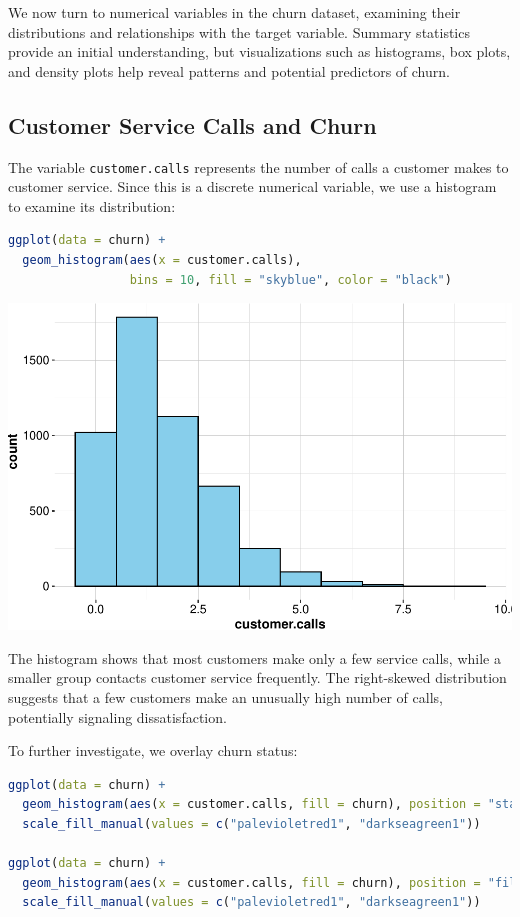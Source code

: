 \documentclass[
]{book}
\newcommand{\passthrough}[1]{#1}
\theoremstyle{definition}
\theoremstyle{definition}
\theoremstyle{definition}
\theoremstyle{definition}
\theoremstyle{remark}
\begin{document}
We now turn to numerical variables in the churn dataset, examining their distributions and relationships with the target variable. Summary statistics provide an initial understanding, but visualizations such as histograms, box plots, and density plots help reveal patterns and potential predictors of churn.

\subsection*{Customer Service Calls and Churn}\label{customer-service-calls-and-churn}

The variable \passthrough{\lstinline!customer.calls!} represents the number of calls a customer makes to customer service. Since this is a discrete numerical variable, we use a histogram to examine its distribution:

\begin{lstlisting}[language=R]
ggplot(data = churn) +
  geom_histogram(aes(x = customer.calls), 
                 bins = 10, fill = "skyblue", color = "black")
\end{lstlisting}

\begin{center}\includegraphics[width=0.7\linewidth]{EDA_files/figure-latex/unnamed-chunk-9-1} \end{center}

The histogram shows that most customers make only a few service calls, while a smaller group contacts customer service frequently. The right-skewed distribution suggests that a few customers make an unusually high number of calls, potentially signaling dissatisfaction.

To further investigate, we overlay churn status:

\begin{lstlisting}[language=R]
ggplot(data = churn) +
  geom_histogram(aes(x = customer.calls, fill = churn), position = "stack") +
  scale_fill_manual(values = c("palevioletred1", "darkseagreen1")) 
  
ggplot(data = churn) +
  geom_histogram(aes(x = customer.calls, fill = churn), position = "fill") +
  scale_fill_manual(values = c("palevioletred1", "darkseagreen1")) 
\end{lstlisting}
\end{document}
